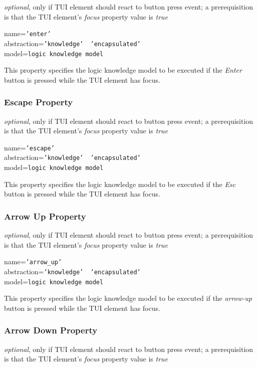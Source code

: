 \emph{optional}, only if TUI element should react to button press event;
a prerequisition is that the TUI element's \emph{focus} property value is \emph{true}

name=\texttt{'enter'}\\
abstraction=\texttt{'knowledge' \vline\ 'encapsulated'}\\
model=\texttt{logic knowledge model}

This property specifies the logic knowledge model to be executed if the
\emph{Enter} button is pressed while the TUI element has focus.

\subsubsection{Escape Property}

\emph{optional}, only if TUI element should react to button press event;
a prerequisition is that the TUI element's \emph{focus} property value is \emph{true}

name=\texttt{'escape'}\\
abstraction=\texttt{'knowledge' \vline\ 'encapsulated'}\\
model=\texttt{logic knowledge model}

This property specifies the logic knowledge model to be executed if the
\emph{Esc} button is pressed while the TUI element has focus.

\subsubsection{Arrow Up Property}

\emph{optional}, only if TUI element should react to button press event;
a prerequisition is that the TUI element's \emph{focus} property value is \emph{true}

name=\texttt{'arrow\_up'}\\
abstraction=\texttt{'knowledge' \vline\ 'encapsulated'}\\
model=\texttt{logic knowledge model}

This property specifies the logic knowledge model to be executed if the
\emph{arrow-up} button is pressed while the TUI element has focus.

\subsubsection{Arrow Down Property}

\emph{optional}, only if TUI element should react to button press event;
a prerequisition is that the TUI element's \emph{focus} property value is \emph{true}

